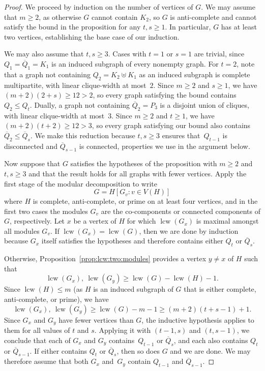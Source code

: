 \documentclass[10pt]{article}
\newcommand{\lcw}{\operatorname{lcw}}
\theoremstyle{plain}
\begin{document}
\begin{proof}
We proceed by induction on the number of vertices of $G$. We may assume that $m\ge 2$, as otherwise $G$ cannot contain $K_2$, so $G$ is anti-complete and cannot satisfy the bound in the proposition for any $t,s\ge 1$. In particular, $G$ has at least two vertices, establishing the base case of our induction.

We may also assume that $t,s\ge 3$. Cases with $t=1$ or $s=1$ are trivial, since $Q_1=\overline{Q}_1=K_1$ is an induced subgraph of every nonempty graph. For $t=2$, note that a graph not containing $Q_2=K_2\uplus K_1$ as an induced subgraph is complete multipartite, with linear clique-width at most~$2$. Since $m\ge 2$ and $s\ge 1$, we have $(m+2)(2+s)\ge 12>2$, so every graph satisfying the bound contains $Q_2\le Q_t$. Dually, a graph not containing $\overline{Q}_2=P_3$ is a disjoint union of cliques, with linear clique-width at most~$3$. Since $m\ge 2$ and $t\ge 1$, we have $(m+2)(t+2)\ge 12>3$, so every graph satisfying our bound also contains $\overline{Q}_2\le\overline{Q}_s$. We make this reduction because $t,s\ge 3$ ensures that~$Q_{t-1}$ is disconnected and $\overline{Q}_{s-1}$ is connected, properties we use in the argument below.

%
%
%

Now suppose that $G$ satisfies the hypotheses of the proposition with $m\ge 2$ and $t,s\ge 3$ and that the result holds for all graphs with fewer vertices. Apply the first stage of the modular decomposition to write
\[
	G=H[G_v : v\in V(H)]
\]
where $H$ is complete, anti-complete, or prime on at least four vertices, and in the first two cases the modules $G_v$ are the co-components or connected components of $G$, respectively. Let $x$ be a vertex of $H$ for which $\lcw(G_x)$ is maximal amongst all modules $G_v$. If $\lcw(G_x)=\lcw(G)$, then we are done by induction because $G_x$ itself satisfies the hypotheses and therefore contains either $Q_t$ or $\overline{Q}_s$.

Otherwise, Proposition~\ref{prop:lcw:two:modules} provides a vertex $y\neq x$ of $H$ such that
\[
	\lcw(G_x),\ \lcw(G_y)
	\ge
	\lcw(G)-\lcw(H)-1.
\]
Since $\lcw(H)\le m$ (as $H$ is an induced subgraph of $G$ that is either complete, anti-complete, or prime), we have
\[
	\lcw(G_x),\ \lcw(G_y)
	\ge
	\lcw(G)-m-1
	\ge
	(m+2)(t+s-1)+1.
\]
Since $G_x$ and $G_y$ have fewer vertices than $G$, the inductive hypothesis applies to them for all values of $t$ and $s$. Applying it with $(t-1,s)$ and $(t,s-1)$, we conclude that each of $G_x$ and $G_y$ contains~$Q_{t-1}$ or $\overline{Q}_s$, and each also contains $Q_t$ or $\overline{Q}_{s-1}$. If either contains $Q_t$ or $\overline{Q}_s$, then so does $G$ and we are done. We may therefore assume that both $G_x$ and~$G_y$ contain $Q_{t-1}$ and $\overline{Q}_{s-1}$.


\end{proof}
\end{document}
